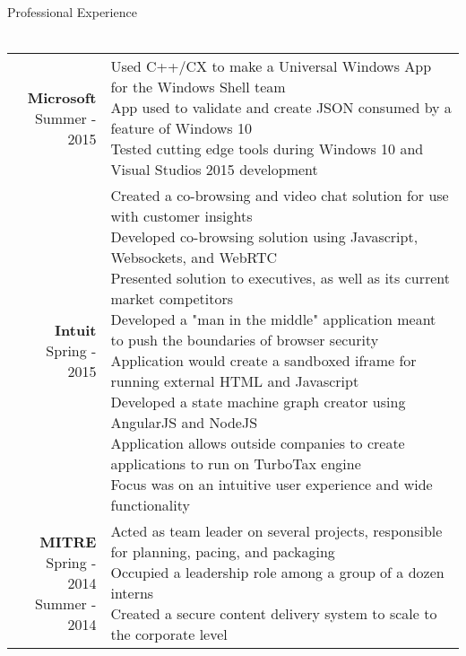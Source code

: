 \documentclass{article}
\makeatletter
\newcommand{\lineseparator}[1]{\noindent\makebox[\linewidth]{\rule{\textwidth}{#1}}}
\newcommand*\lineBr[2][c]{\begin{tabular}[#1]{@{}r@{}}#2\end{tabular}}
\newcommand*\lineBl[2][c]{\begin{tabular}[#1]{@{}l@{}}#2\end{tabular}}
\makeatother
\begin{document}
{\Large Professional Experience } \\
\lineseparator{0.5pt}
\\[2mm]
\begin{tabularx}{\textwidth}{ r | X }
  \vspace{2mm}
  \hspace{6mm}
  \lineBr{ {\large {\bf Microsoft }\\Summer - 2015}} &
  \lineBl{
    Used C++/CX to make a Universal Windows App for the Windows Shell team \\ 
    App used to validate and create JSON consumed by a feature of Windows 10 \\
    Tested cutting edge tools during Windows 10 and Visual Studios 2015 development 
  } \\
  \vspace{2mm}
  \hspace{6mm}
  \lineBr{ {\large {\bf Intuit }\\Spring - 2015}} &
  \lineBl{
    Created a co-browsing and video chat solution for use with customer insights \\
    Developed co-browsing solution using Javascript, Websockets, and WebRTC \\
    Presented solution to executives, as well as its current market competitors \\
    Developed a "man in the middle" application meant to push the boundaries of browser security \\
    Application would create a sandboxed iframe for running external HTML and Javascript \\
    Developed a state machine graph creator using AngularJS and NodeJS \\
    Application allows outside companies to create applications to run on TurboTax engine \\
    Focus was on an intuitive user experience and wide functionality \\
  } \\
  \vspace{2mm}
  \hspace{6mm}
  \lineBr{ {\large {\bf MITRE }\\Spring - 2014\\Summer - 2014}} &
  \lineBl{
    Acted as team leader on several projects, responsible for planning, pacing, and packaging \\
    Occupied a leadership role among a group of a dozen interns \\
    Created a secure content delivery system to scale to the corporate level \\
}
\end{tabularx}
\end{document}
